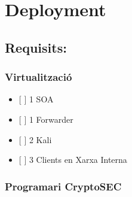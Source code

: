 \documentclass[]{article}
\providecommand{\tightlist}{%
  \setlength{\itemsep}{0pt}\setlength{\parskip}{0pt}}
\begin{document}
\hypertarget{deployment}{%
\section{Deployment}\label{deployment}}

\hypertarget{requisits}{%
\subsection{Requisits:}\label{requisits}}

\hypertarget{virtualitzaciuxf3}{%
\subsubsection{\texorpdfstring{\textbf{Virtualització}}{Virtualització}}\label{virtualitzaciuxf3}}

\begin{itemize}
\tightlist
\item
  {[} {]} 1 SOA
\item
  {[} {]} 1 Forwarder
\item
  {[} {]} 2 Kali
\item
  {[} {]} 3 Clients en Xarxa Interna
\end{itemize}

\hypertarget{programari-cryptosec}{%
\subsubsection{\texorpdfstring{\textbf{Programari
CryptoSEC}}{Programari CryptoSEC}}\label{programari-cryptosec}}
\end{document}

